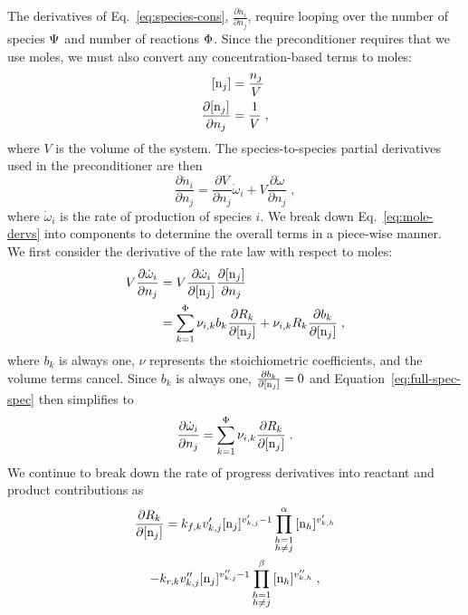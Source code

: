 \documentclass[twocolumn,10pt]{article} %
\begin{document}
%
%
The derivatives of Eq.~\eqref{eq:species-cons}, $\frac{\partial \dot{n}_i}{\partial n_j}$, require looping over the number of species $\Psi$ and number of reactions $\Phi$.
Since the preconditioner requires that we use moles, we must also convert any concentration-based terms to moles:
\begin{align}
    \conc{n_j} &= \frac{n_j}{V}\\
    \frac{\partial \conc{n_j}}{\partial n_j} &= \frac{1}{V} \;,
\end{align}
where $V$ is the volume of the system.
The species-to-species partial derivatives used in the preconditioner are then
\begin{equation}
    \label{eq:mole-dervs}
    \frac{\partial \dot{n}_i}{\partial n_j} = \frac{\partial V}{\partial n_j} \dot{\omega}_i + V\frac{\partial \dot{\omega}}{\partial n_j} \;,
\end{equation}
where $\dot{\omega}_i$ is the rate of production of species $i$.
We break down Eq.~\ref{eq:mole-dervs} into components to determine the overall terms in a piece-wise manner.
We first consider the derivative of the rate law with respect to moles:
\begin{align}
    \label{eq:full-spec-spec}
    V \frac{\partial \dot{\omega}_i}{\partial n_j} &= V \frac{\partial \dot{\omega}_i}{\partial \conc{n_j}} \frac{\partial \conc{n_j}}{\partial n_j} \nonumber \\
    &= \ReacSum{\nu_{i,k}b_k\frac{\partial R_k}{\partial \conc{n_j}} + \nu_{i,k}R_k\frac{\partial b_k}{\partial\conc{n_j}}} \;,
\end{align}
where $b_k$ is always one, $\nu$ represents the stoichiometric coefficients, and the volume terms cancel.
Since $b_k$ is always one, $\frac{\partial b_k}{\partial\conc{n_j}}=0$ and Equation~\eqref{eq:full-spec-spec} then simplifies to
\begin{equation}
    \label{eq:spec-spec-derv}
    \frac{\partial \dot{\omega}_i}{\partial n_j} = \ReacSum{\nu_{i,k}\frac{\partial R_k}{\partial \conc{n_j}}} \;.
\end{equation}
We continue to break down the rate of progress derivatives into reactant and product contributions as
\begin{multline}
    \frac{\partial R_k}{\partial\conc{n_j}} = k_{f,k}{v_{k,j}^\prime} \conc{n_j}^{v_{k,j}^\prime-1}\ReactSpecProd{\conc{n_h}^{v_{k,h}^\prime}}\\
    -k_{r,k}v_{k,j}^{\prime\prime}\conc{n_j}^{v_{k,j}^{\prime\prime}-1}\ProdSpecProd{\conc{n_h}^{v_{k,h}^{\prime\prime}}} \;,
\end{multline}
\end{document}
